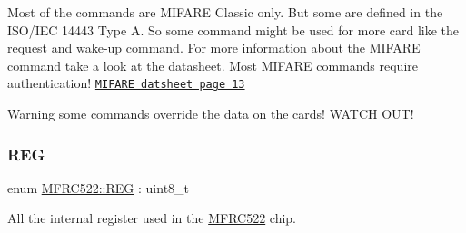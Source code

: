 Most of the commands are M\+I\+F\+A\+RE Classic only. But some are defined in the I\+S\+O/\+I\+EC 14443 Type A. So some command might be used for more card like the request and wake-\/up command. For more information about the M\+I\+F\+A\+RE command take a look at the datasheet. Most M\+I\+F\+A\+RE commands require authentication! \href{http://www.orangetags.com/wp-content/downloads/datasheet/NXP/Mifare%20EV1%201K.pdf}{\tt M\+I\+F\+A\+RE datsheet page 13} \begin{DoxyWarning}{Warning}
some commands override the data on the cards! W\+A\+T\+CH O\+U\+T! 
\end{DoxyWarning}
\mbox{\label{class_m_f_r_c522_ae7ec09eb8c9c61288a4770175b4b8db7}} 
\subsubsection{\texorpdfstring{R\+EG}{REG}}
{\footnotesize\ttfamily enum \mbox{\hyperlink{class_m_f_r_c522_ae7ec09eb8c9c61288a4770175b4b8db7}{M\+F\+R\+C522\+::\+R\+EG}} \+: uint8\+\_\+t}



All the internal register used in the \mbox{\hyperlink{class_m_f_r_c522}{M\+F\+R\+C522}} chip. 

